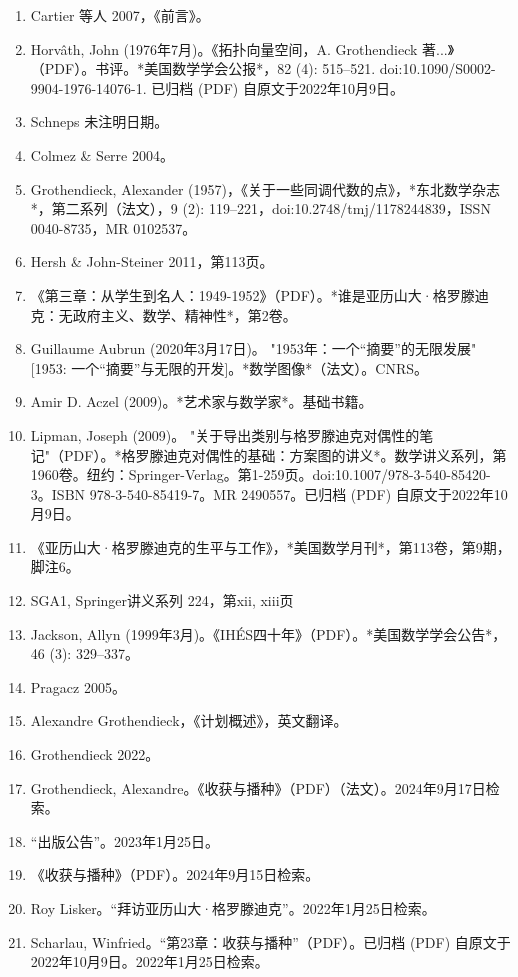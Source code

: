 \begin{enumerate}
\item Cartier 等人 2007，《前言》。  
\item Horvâth, John (1976年7月)。《拓扑向量空间，A. Grothendieck 著...》（PDF）。书评。*美国数学学会公报*，82 (4): 515–521. doi:10.1090/S0002-9904-1976-14076-1. 已归档 (PDF) 自原文于2022年10月9日。  
\item Schneps 未注明日期。  
\item Colmez & Serre 2004。  
\item Grothendieck, Alexander (1957)，《关于一些同调代数的点》，*东北数学杂志*，第二系列（法文），9 (2): 119–221，doi:10.2748/tmj/1178244839，ISSN 0040-8735，MR 0102537。  
\item Hersh & John-Steiner 2011，第113页。  
\item 《第三章：从学生到名人：1949-1952》（PDF）。*谁是亚历山大·格罗滕迪克：无政府主义、数学、精神性*，第2卷。  
\item Guillaume Aubrun (2020年3月17日)。 "1953年：一个“摘要”的无限发展" [1953: 一个“摘要”与无限的开发]。*数学图像*（法文）。CNRS。  
\item Amir D. Aczel (2009)。*艺术家与数学家*。基础书籍。  
\item Lipman, Joseph (2009)。 "关于导出类别与格罗滕迪克对偶性的笔记"（PDF）。*格罗滕迪克对偶性的基础：方案图的讲义*。数学讲义系列，第1960卷。纽约：Springer-Verlag。第1-259页。doi:10.1007/978-3-540-85420-3。ISBN 978-3-540-85419-7。MR 2490557。已归档 (PDF) 自原文于2022年10月9日。  
\item 《亚历山大·格罗滕迪克的生平与工作》，*美国数学月刊*，第113卷，第9期，脚注6。
\item SGA1, Springer讲义系列 224，第xii, xiii页  
\item Jackson, Allyn (1999年3月)。《IHÉS四十年》（PDF）。*美国数学学会公告*，46 (3): 329–337。  
\item Pragacz 2005。  
\item Alexandre Grothendieck，《计划概述》，英文翻译。  
\item Grothendieck 2022。  
\item Grothendieck, Alexandre。《收获与播种》（PDF）（法文）。2024年9月17日检索。  
\item “出版公告”。2023年1月25日。  
\item 《收获与播种》（PDF）。2024年9月15日检索。  
\item Roy Lisker。“拜访亚历山大·格罗滕迪克”。2022年1月25日检索。  
\item Scharlau, Winfried。“第23章：收获与播种”（PDF）。已归档 (PDF) 自原文于2022年10月9日。2022年1月25日检索。  

\end{enumerate}
